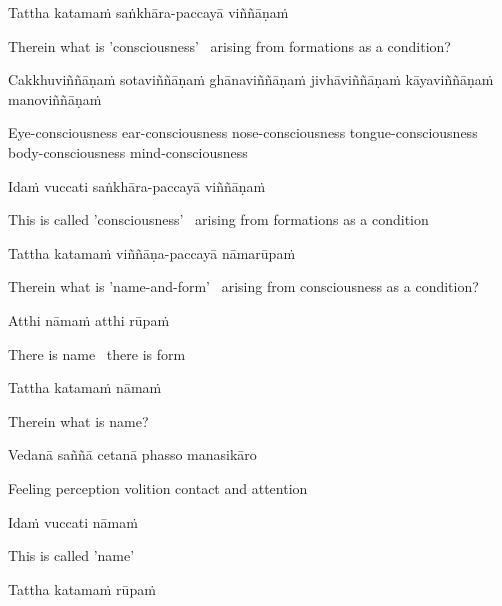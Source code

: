 Tattha katamaṁ saṅkhāra-paccayā viññāṇaṁ

\begin{english}
  Therein what is 'consciousness' \breathmark\ arising from formations as a condition?
\end{english}

Cakkhuviññāṇaṁ sotaviññāṇaṁ ghānaviññāṇaṁ jivhāviññāṇaṁ kāyaviññāṇaṁ manoviññāṇaṁ

\begin{english}
  Eye-consciousness ear-consciousness nose-consciousness tongue-consciousness body-consciousness mind-consciousness
\end{english}

Idaṁ vuccati saṅkhāra-paccayā viññāṇaṁ

\begin{english}
  This is called 'consciousness' \breathmark\ arising from formations as a condition
\end{english}

Tattha katamaṁ viññāṇa-paccayā nāmarūpaṁ

\begin{english}
  Therein what is 'name-and-form' \breathmark\ arising from consciousness as a condition?
\end{english}

Atthi nāmaṁ atthi rūpaṁ

\begin{english}
  There is name \breathmark\ there is form
\end{english}

Tattha katamaṁ nāmaṁ

\begin{english}
  Therein what is name?
\end{english}

Vedanā saññā cetanā phasso manasikāro

\begin{english}
  Feeling perception volition contact and attention
\end{english}

Idaṁ vuccati nāmaṁ

\begin{english}
  This is called 'name'
\end{english}

Tattha katamaṁ rūpaṁ

